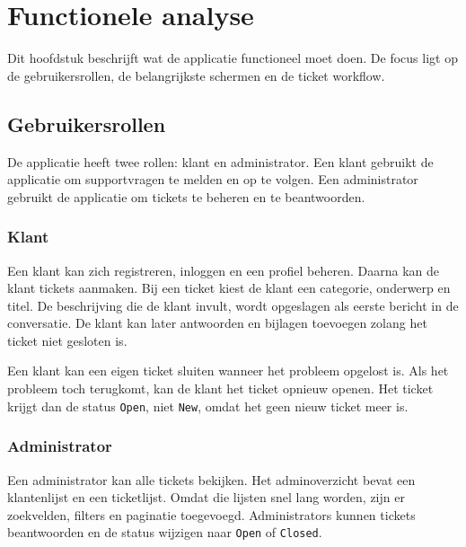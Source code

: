 ﻿%

\chapter{Functionele analyse}%
\label{ch:functionele-analyse}

Dit hoofdstuk beschrijft wat de applicatie functioneel moet doen. De focus ligt op de gebruikersrollen, de belangrijkste schermen en de ticket workflow.

\section{Gebruikersrollen}

De applicatie heeft twee rollen: klant en administrator. Een klant gebruikt de applicatie om supportvragen te melden en op te volgen. Een administrator gebruikt de applicatie om tickets te beheren en te beantwoorden.

\subsection{Klant}

Een klant kan zich registreren, inloggen en een profiel beheren. Daarna kan de klant tickets aanmaken. Bij een ticket kiest de klant een categorie, onderwerp en titel. De beschrijving die de klant invult, wordt opgeslagen als eerste bericht in de conversatie. De klant kan later antwoorden en bijlagen toevoegen zolang het ticket niet gesloten is.

Een klant kan een eigen ticket sluiten wanneer het probleem opgelost is. Als het probleem toch terugkomt, kan de klant het ticket opnieuw openen. Het ticket krijgt dan de status \texttt{Open}, niet \texttt{New}, omdat het geen nieuw ticket meer is.

\subsection{Administrator}

Een administrator kan alle tickets bekijken. Het adminoverzicht bevat een klantenlijst en een ticketlijst. Omdat die lijsten snel lang worden, zijn er zoekvelden, filters en paginatie toegevoegd. Administrators kunnen tickets beantwoorden en de status wijzigen naar \texttt{Open} of \texttt{Closed}.

